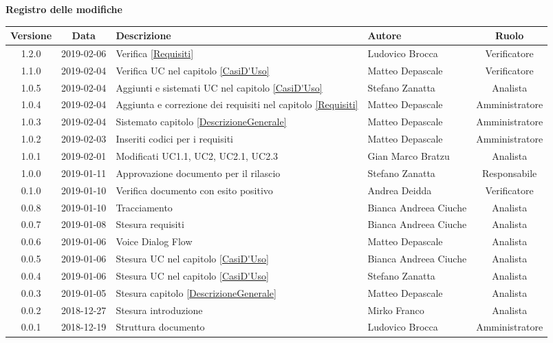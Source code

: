 	\begin{center}
		\textbf{Registro delle modifiche}
	\end{center}
	\begin{center}
		\begin{tabularx}{\textwidth}{|c|c|X|X|c|}
			\hline
			\textbf{Versione} & \textbf{Data} & \textbf{Descrizione} & \textbf{Autore} & \textbf{Ruolo} \\
			\hline
			1.2.0 & 2019-02-06 & Verifica \ref{Requisiti}& Ludovico Brocca & Verificatore \\
			1.1.0 & 2019-02-04 & Verifica UC nel capitolo \ref{CasiD'Uso}& Matteo Depascale & Verificatore\\
			\hline
			1.0.5 & 2019-02-04 & Aggiunti e sistemati UC nel capitolo \ref{CasiD'Uso}& Stefano Zanatta & Analista\\
			\hline
			1.0.4 & 2019-02-04 & Aggiunta e correzione dei requisiti nel capitolo \ref{Requisiti}& Matteo Depascale & Amministratore\\
			\hline
			1.0.3 & 2019-02-04 & Sistemato capitolo \ref{DescrizioneGenerale}& Matteo Depascale & Amministratore\\
			\hline
			1.0.2 & 2019-02-03 & Inseriti codici per i requisiti & Matteo Depascale & Amministratore\\
			\hline
			1.0.1 & 2019-02-01 & Modificati UC1.1, UC2, UC2.1, UC2.3 & Gian Marco Bratzu & Analista\\
			\hline
			1.0.0 & 2019-01-11 & Approvazione documento per il rilascio& Stefano Zanatta & Responsabile\\
			\hline
			0.1.0 & 2019-01-10 & Verifica documento con esito positivo& Andrea Deidda & Verificatore\\
			\hline
			0.0.8 & 2019-01-10 & Tracciamento& Bianca Andreea Ciuche& Analista\\
			\hline
			0.0.7 & 2019-01-08 & Stesura requisiti & Bianca Andreea Ciuche& Analista\\
			\hline
			0.0.6 & 2019-01-06 & Voice Dialog Flow & Matteo Depascale & Analista\\
			\hline
			0.0.5 & 2019-01-06 & Stesura UC nel capitolo \ref{CasiD'Uso}& Bianca Andreea Ciuche & Analista\\
			\hline
			0.0.4 & 2019-01-06 & Stesura UC nel capitolo \ref{CasiD'Uso}& Stefano Zanatta & Analista\\
			\hline
			0.0.3 & 2019-01-05 & Stesura capitolo \ref{DescrizioneGenerale}& Matteo Depascale & Analista\\
			\hline
			0.0.2 & 2018-12-27 & Stesura introduzione & Mirko Franco & Analista\\
			\hline
			0.0.1 & 2018-12-19 & Struttura documento & Ludovico Brocca & Amministratore\\
			\hline
		\end{tabularx}
	\end{center}
\newpage